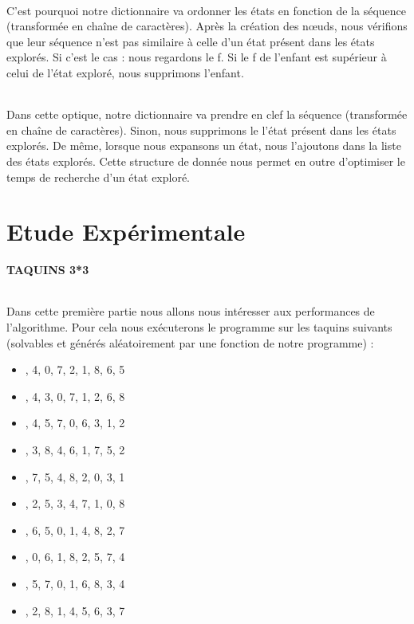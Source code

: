 \documentclass[10pt,a4paper]{report}
\begin{document}
\paragraph{}{C'est pourquoi notre dictionnaire va ordonner les états en fonction de la séquence (transformée en chaîne de caractères). Après la création des nœuds, nous vérifions que leur séquence n'est pas similaire à celle d'un état présent dans les états explorés. Si c'est le cas : nous regardons le f. Si le f de l'enfant est supérieur à celui de l'état exploré, nous supprimons l'enfant.}
\paragraph{}{Dans cette optique, notre dictionnaire va prendre en clef la séquence (transformée en chaîne de caractères). Sinon, nous supprimons le l'état présent dans les états explorés. De même, lorsque nous expansons un état, nous l'ajoutons dans la liste des états explorés. Cette structure de donnée nous permet en outre d'optimiser le temps de recherche d'un état exploré.}



\part{Etude Expérimentale}
\textbf{TAQUINS 3*3}
\paragraph{}{Dans cette première partie nous allons nous intéresser aux performances de l'algorithme. Pour cela nous exécuterons le programme sur les taquins suivants (solvables et générés aléatoirement par une fonction de notre programme) : }
\begin{itemize}
\item {}, 4, 0, 7, 2, 1, 8, 6, 5\rbrack
\item	{}, 4, 3, 0, 7, 1, 2, 6, 8\rbrack
\item	{}, 4, 5, 7, 0, 6, 3, 1, 2\rbrack
\item {}, 3, 8, 4, 6, 1, 7, 5, 2\rbrack
\item	{}, 7, 5, 4, 8, 2, 0, 3, 1\rbrack
\item {}, 2, 5, 3, 4, 7, 1, 0, 8\rbrack
\item {}, 6, 5, 0, 1, 4, 8, 2, 7\rbrack
\item {}, 0, 6, 1, 8, 2, 5, 7, 4\rbrack
\item {}, 5, 7, 0, 1, 6, 8, 3, 4\rbrack
\item {}, 2, 8, 1, 4, 5, 6, 3, 7\rbrack
\end{itemize}
\end{document}
